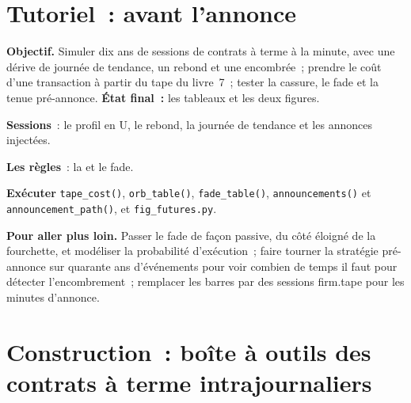 \section{Tutoriel~: avant l'annonce}\label{tut:s1:short-term-futures-strategies:tut}

\begin{tutorial}
\textbf{Objectif.} Simuler dix ans de sessions de contrats à terme à la minute, avec une dérive de journée de tendance, un rebond et une  encombrée~; prendre le coût
d'une transaction à partir du tape du livre~7~; tester la cassure, le fade et la tenue pré-annonce. \textbf{État final~:} les tableaux et les deux figures.
\begin{tutsteps}
\item \textbf{Sessions}~: le profil en U, le rebond, la journée de tendance et les annonces injectées.
\label{lst:s1:short-term-futures-strategies:sessions}
\item \textbf{Les règles}~: la  et le fade.
\label{lst:s1:short-term-futures-strategies:rules}
\item \textbf{Exécuter} \texttt{tape\_cost()}, \texttt{orb\_table()}, \texttt{fade\_table()}, \texttt{announcements()} et \texttt{announcement\_path()}, et
\texttt{fig\_futures.py}.
\end{tutsteps}
\textbf{Pour aller plus loin.} Passer le fade de façon passive, du côté éloigné de la fourchette, et modéliser la probabilité d'exécution~; faire tourner la stratégie pré-annonce sur
quarante ans d'événements pour voir combien de temps il faut pour détecter l'encombrement~; remplacer les barres par des sessions firm.tape pour les minutes d'annonce.
\end{tutorial}

\section{Construction~: boîte à outils des contrats à terme intrajournaliers}\label{bld:s1:short-term-futures-strategies:futintraday}

